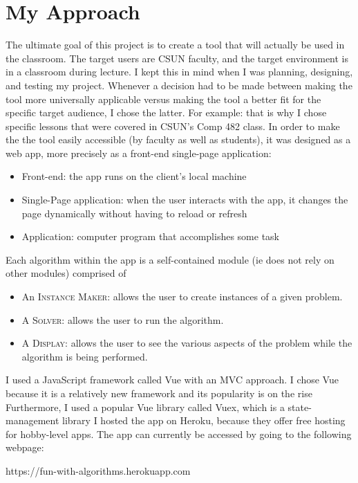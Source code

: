 \section{My Approach}
\hspace{-0.25in}The ultimate goal of this project is to create a tool that will actually be used 
in the classroom. The target users are CSUN faculty, and the target environment 
is in a classroom during lecture.
I kept this in mind when I was planning, designing, and testing my project. 
Whenever a decision had to be made between 
making the tool more universally applicable 
versus making the tool a better fit for the specific target audience,
I chose the latter. For example: that is why I chose 
specific lessons that were covered in CSUN's Comp 482 class.
\newline\newline
In order to make the the tool easily accessible (by faculty as well as students), 
it was designed as a web app, more precisely as a front-end single-page application:
\begin{itemize}
	\item Front-end: the app runs on the client's local machine
	\item Single-Page application: when the user interacts with the app,
		it changes the page dynamically without having to reload or refresh 
	\item Application: computer program that accomplishes some task
\end{itemize}
Each algorithm within the app is a self-contained module 
(ie does not rely on other modules) 
comprised of 
\begin{itemize}
	\item An \textsc{Instance Maker}: allows the user to create 
		instances of a given problem.
	\item A \textsc{Solver}: allows the user to run the algorithm.
	\item A \textsc{Display}: allows the user to see the various aspects
		of the problem while the algorithm is being performed.
\end{itemize} 
I used a JavaScript framework called Vue with an MVC approach.
I chose Vue because it is a relatively new framework and 
its popularity is on the rise \cite{top-js-libraries}
Furthermore, I used a popular Vue library called Vuex, which is 
a state-management library \cite{vue}
I hosted the app on Heroku, because they offer free hosting for hobby-level apps. 
The app can currently be accessed by going to the following webpage:
\begin{center}

https://fun-with-algorithms.herokuapp.com
	
\end{center}
